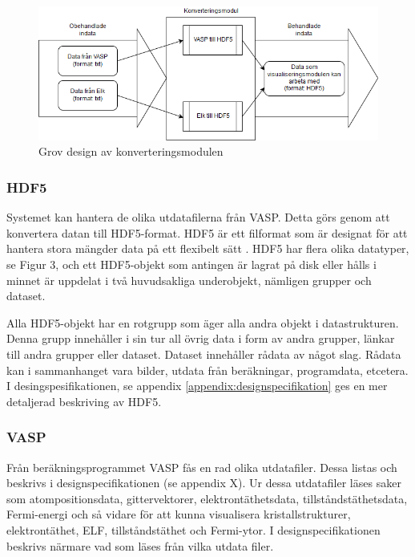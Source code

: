 \documentclass[a4paper,12pt]{article}
\begin{document}
\begin{figure}[H]
	\centering
	\includegraphics[scale=0.55]{konverteringdetalj.png}
	\caption{Grov design av konverteringsmodulen}
	\label{fig:konverteringdetalj}
\end{figure}

\subsubsection{HDF5}
Systemet kan hantera de olika utdatafilerna från VASP.%
Detta görs genom att konvertera datan till HDF5-format.
HDF5 är ett filformat som är designat för att hantera stora mängder data på ett flexibelt sätt \cite{hdf5}.
HDF5 har flera olika datatyper, se Figur 3, och ett HDF5-objekt som antingen är lagrat på disk eller hålls i minnet är uppdelat i två huvudsakliga underobjekt, nämligen grupper och dataset.

Alla HDF5-objekt har en rotgrupp som äger alla andra objekt i datastrukturen. Denna grupp innehåller i sin tur all övrig data i form av andra grupper, länkar till andra grupper eller dataset.
Dataset innehåller rådata av något slag. Rådata kan i sammanhanget vara bilder, utdata från beräkningar, programdata, etcetera. %
I desingspesifikationen, se appendix \ref{appendix:designspecifikation} ges en mer detaljerad beskriving av HDF5.

\subsubsection{VASP}
Från beräkningsprogrammet VASP fås en rad olika utdatafiler. Dessa listas och beskrivs i designspecifikationen %
(se appendix X). Ur dessa utdatafiler läses saker som atompositionsdata, gittervektorer, elektrontäthetsdata, tillståndstäthetsdata, Fermi-energi och så vidare för att kunna visualisera kristallstrukturer, elektrontäthet, ELF, tillståndstäthet och Fermi-ytor. I designspecifikationen %
beskrivs närmare vad som läses från vilka utdata filer. 
\end{document}
